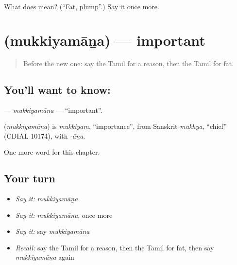 \begin{tcolorbox}[breakable,colback=teal!4,colframe=teal!35!black,title={Before you move on}]
What does  mean? (\textquotedblleft{}Fat, plump\textquotedblright{}.) Say it once more.
\end{tcolorbox}
\section[\texorpdfstring{\ta{முக்கியமான} (mukkiyamāṉa)}{முக்கியமான (mukkiyamāṉa)}]{ (mukkiyamāṉa) — important}

\label{lesson:TA-C267-mukkiyamana}



\begin{quote}
Before the new one: say the Tamil for a reason, then the Tamil for fat.
\end{quote}

\subsection*{You'll want to know: }
\textbf{} — \emph{mukkiyamāṉa} — \textquotedblleft{}important\textquotedblright{}.

\begin{cousinweb}
\textbf{} (\emph{mukkiyamāṉa}) is \emph{mukkiyam}, \textquotedblleft{}importance\textquotedblright{}, from Sanskrit \emph{mukhya}, \textquotedblleft{}chief\textquotedblright{} (CDIAL 10174), with \emph{-āṉa}.
\end{cousinweb}

\begin{grammarlens}[title={What you've built}]
One more word for this chapter.
\end{grammarlens}

\subsection*{Your turn}
\begin{itemize}
\raggedright
  \item \emph{Say it:} \emph{mukkiyamāṉa}
  \item \emph{Say it:} \emph{mukkiyamāṉa}, once more
  \item \emph{Say it:} say \emph{mukkiyamāṉa}
  \item \emph{Recall:} say the Tamil for a reason, then the Tamil for fat, then say \emph{mukkiyamāṉa} again
\end{itemize}


